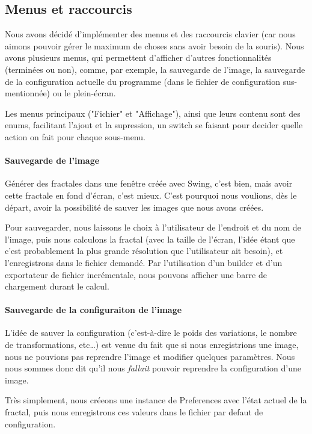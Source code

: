 \documentclass[a4paper]{article}
\begin{document}
\subsection*{Menus et raccourcis}
Nous avons décidé d'implémenter des menus et des raccourcis clavier (car nous aimons pouvoir gérer le maximum de choses sans avoir besoin de la souris). Nous avons plusieurs menus, qui permettent d'afficher d'autres fonctionnalités (terminées ou non), comme, par exemple, la sauvegarde de l'image, la sauvegarde de la configuration actuelle du programme (dans le fichier de configuration sus-mentionnée) ou le plein-écran.

Les menus principaux ("Fichier" et "Affichage"), ainsi que leurs contenu sont des enums, facilitant l'ajout et la supression, un switch se faisant pour decider quelle action on fait pour chaque sous-menu.

\paragraph{Sauvegarde de l'image}
Générer des fractales dans une fenêtre créée avec Swing, c'est bien, mais avoir cette fractale en fond d'écran, c'est mieux. C'est pourquoi nous voulions, dès le départ, avoir la possibilité de sauver les images que nous avons créées.

Pour sauvegarder, nous laissons le choix à l'utilisateur de l'endroit et du nom de l'image, puis nous calculons la fractal (avec la taille de l'écran, l'idée étant que c'est probablement la plus grande résolution que l'utilisateur ait besoin), et l'enregistrons dans le fichier demandé. Par l'utilisation d'un builder et d'un exportateur de fichier incrémentale, nous pouvons afficher une barre de chargement durant le calcul.

\paragraph{Sauvegarde de la configuraiton de l'image}
L'idée de sauver la configuration (c'est-à-dire le poids des variations, le nombre de transformations, etc\ldots) est venue du fait que si nous enregistrions une image, nous ne pouvions pas reprendre l'image et modifier quelques paramètres. Nous nous sommes donc dit qu'il nous \textit{fallait} pouvoir reprendre la configuration d'une image.

Très simplement, nous créeons une instance de Preferences avec l'état actuel de la fractal, puis nous enregistrons ces valeurs dans le fichier par defaut de configuration.
\end{document}
